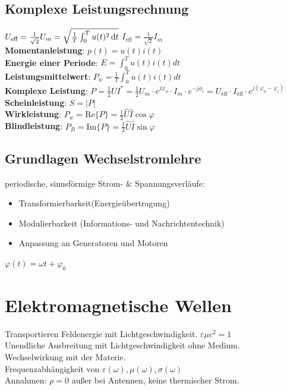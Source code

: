 \documentclass[6pt,a4paper]{scrartcl}
\begin{document}
\begin{multicols}{4}
{	\subsection{Komplexe Leistungsrechnung}
	$U_{\text{eff}} = \frac{1}{\sqrt{2}}U_m = \sqrt{\frac{1}{T}\int_0^T u(t)^2\diff t}$\qquad
	$I_{\text{eff}} = \frac{1}{\sqrt{2}}I_m$\\
	\textbf{Momentanleistung}: $p(t) = u(t)i(t)$\\
	\textbf{Energie einer Periode}: $E=\int_0^Tu(t)i(t)dt$\\
	\textbf{Leistungsmittelwert}: $P_w = \frac{1}{T} \int_0^T u(t)i(t)dt$\\
	\textbf{Komplexe Leistung}: $P = \frac{1}{2}UI^* = \frac{1}{2}U_m\cdot e^{j\varphi_u}\cdot I_m\cdot e^{-j\phi_i} = U_{\text{eff}}\cdot I_{\text{eff}}\cdot e^{j(\varphi_u-\varphi_i)}$\\
	\textbf{Scheinleistung}: $S = |P|$\\
	\textbf{Wirkleistung}: $P_w = \text{Re}\{P\} = \frac{1}{2}\hat U\hat I\cos \varphi$\\
	\textbf{Blindleistung}: $P_B = \text{Im}\{P\} = \frac{1}{2}\hat U\hat I\sin \varphi$
}

	\subsection{Grundlagen Wechselstromlehre}
	periodische, sinusförmige Strom- \& Spannungsverläufe:\\
	\begin{itemize}
		\item Transformierbarkeit(Energieübertragung) 
		\item Modulierbarkeit (Informations- und Nachrichtentechnik)
		\item Anpassung an Generatoren und Motoren
	\end{itemize}
	$\varphi(t) = \omega t + \varphi_0$ 



\section{Elektromagnetische Wellen}
Transportieren Feldenergie mit Lichtgeschwindigkeit. $\varepsilon \mu c^2 = 1$\\ 
Unendliche Ausbreitung mit Lichtgeschwindigkeit ohne Medium.\\
Wechselwirkung mit der Materie.\\
Frequenzabhängigkeit von $\varepsilon(\omega),\mu(\omega),\sigma(\omega)$\\
Annahmen: $\rho = 0$ außer bei Antennen, keine thermischer Strom.\\


\end{multicols}
\end{document}
